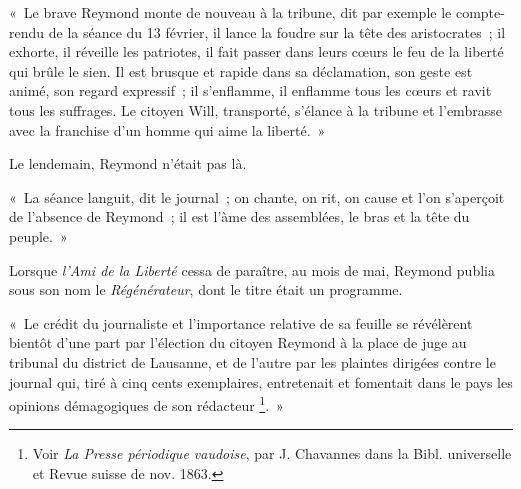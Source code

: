 \documentclass[french,twoside]{book} %
\newenvironment{quoteblock}%
  {\begin{quoting}}
  {\end{quoting}}
\newenvironment{quotebar}{%
    \def\FrameCommand{{\color{rubric!10!}\vrule width 0.5em} \hspace{0.9em}}%
    \def\OuterFrameSep{\itemsep} %
    \MakeFramed {\advance\hsize-\width \FrameRestore}
  }%
  {%
    \endMakeFramed
  }
\renewenvironment{quoteblock}%
  {%
    \savenotes
    \setstretch{0.9}
    \normalfont
    \begin{quotebar}
  }
  {%
    \end{quotebar}
    \spewnotes
  }
\begin{document}
\begin{quoteblock}
\noindent « Le brave Reymond monte de nouveau à la tribune, dit par exemple le compte-rendu de la séance du 13 février, il lance la foudre sur la tête des aristocrates ; il exhorte, il réveille les patriotes, il fait passer dans leurs cœurs le feu de la liberté qui brûle le sien. Il est brusque et rapide dans sa déclamation, son geste est animé, son regard expressif ; il s’enflamme, il enflamme tous les cœurs et ravit tous les suffrages. Le citoyen Will, transporté, s’élance à la tribune et l’embrasse avec la franchise d’un homme qui aime la liberté. »\end{quoteblock}

\noindent Le lendemain, Reymond n’était pas là.\par

\begin{quoteblock}
\noindent « La séance languit, dit le journal ; on chante, on rit, on cause et l’on s’aperçoit de l’absence de Reymond ; il est l’àme des assemblées, le bras et la tête du peuple. »\end{quoteblock}

\noindent Lorsque \emph{l’Ami de la Liberté} cessa de paraître, au mois de mai, Reymond publia sous son nom le \emph{Régénérateur}, dont le titre était un programme.\par

\begin{quoteblock}
\noindent « Le crédit du journaliste et l’importance relative de sa feuille se révélèrent bientôt d’une part par l’élection du citoyen Reymond à la place de juge au tribunal du district de Lausanne, et de l’autre par les plaintes dirigées contre le journal qui, tiré à cinq cents exemplaires, entretenait et fomentait dans le pays les opinions démagogiques de son rédacteur \footnote{Voir \emph{La Presse périodique vaudoise}, par J. Chavannes dans la Bibl. universelle et Revue suisse de nov. 1863.}. »\end{quoteblock}
\end{document}

